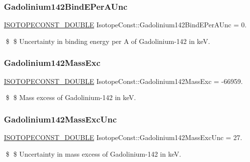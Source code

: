 \subsubsection{\texorpdfstring{Gadolinium142\+Bind\+E\+Per\+A\+Unc}{Gadolinium142BindEPerAUnc}}
{\footnotesize\ttfamily \mbox{\hyperlink{group___isotope_const-_macros_ga8f45a7272ce02c0b4c65c44636ed719a}{I\+S\+O\+T\+O\+P\+E\+C\+O\+N\+S\+T\+\_\+\+D\+O\+U\+B\+LE}} Isotope\+Const\+::\+Gadolinium142\+Bind\+E\+Per\+A\+Unc = 0.}

\$ \$ Uncertainty in binding energy per A of Gadolinium-\/142 in keV. \mbox{\label{group___isotope_const-_gadolinium-_gd142_gab940a62dc56779d9dcdc2188728bb0ae}} 
\subsubsection{\texorpdfstring{Gadolinium142\+Mass\+Exc}{Gadolinium142MassExc}}
{\footnotesize\ttfamily \mbox{\hyperlink{group___isotope_const-_macros_ga8f45a7272ce02c0b4c65c44636ed719a}{I\+S\+O\+T\+O\+P\+E\+C\+O\+N\+S\+T\+\_\+\+D\+O\+U\+B\+LE}} Isotope\+Const\+::\+Gadolinium142\+Mass\+Exc = -\/66959.}

\$ \$ Mass excess of Gadolinium-\/142 in keV. \mbox{\label{group___isotope_const-_gadolinium-_gd142_ga394adffcf00a8e82460e98b526640b6e}} 
\subsubsection{\texorpdfstring{Gadolinium142\+Mass\+Exc\+Unc}{Gadolinium142MassExcUnc}}
{\footnotesize\ttfamily \mbox{\hyperlink{group___isotope_const-_macros_ga8f45a7272ce02c0b4c65c44636ed719a}{I\+S\+O\+T\+O\+P\+E\+C\+O\+N\+S\+T\+\_\+\+D\+O\+U\+B\+LE}} Isotope\+Const\+::\+Gadolinium142\+Mass\+Exc\+Unc = 27.}

\$ \$ Uncertainty in mass excess of Gadolinium-\/142 in keV. \mbox{\label{group___isotope_const-_gadolinium-_gd142_gab440843f50e5241b55a7535838bc3166}} 
